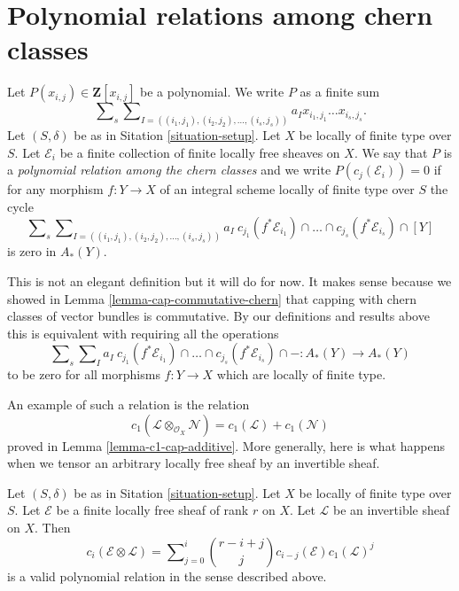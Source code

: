 \section{Polynomial relations among chern classes}
\label{section-relations-chern-classes}

\begin{definition}
\label{definition-polynomial-relation-chern-classes}
Let $P(x_{i, j}) \in \mathbf{Z}[x_{i, j}]$ be a polynomial.
We write $P$ as a finite sum
$$
\sum\nolimits_s
\sum\nolimits_{I = ((i_1, j_1), (i_2, j_2), \ldots, (i_s, j_s))}
a_I x_{i_1, j_1} \ldots x_{i_s, j_s}.
$$
Let $(S, \delta)$ be as in Sitation \ref{situation-setup}.
Let $X$ be locally of finite type over $S$.
Let $\mathcal{E}_i$ be a finite collection of finite
locally free sheaves on $X$. We say that $P$
is a {\it polynomial relation among the chern classes}
and we write $P(c_j(\mathcal{E}_i)) = 0$
if for any morphism $f : Y \to X$ of an integral scheme
locally of finite type over $S$ the cycle
$$
\sum\nolimits_s
\sum\nolimits_{I = ((i_1, j_1), (i_2, j_2), \ldots, (i_s, j_s))}
a_I\ c_{j_1}(f^*\mathcal{E}_{i_1}) \cap \ldots
\cap c_{j_s}(f^*\mathcal{E}_{i_s}) \cap [Y]
$$
is zero in $A_*(Y)$.
\end{definition}

\noindent
This is not an elegant definition but it will do
for now. It makes sense because we showed in
Lemma \ref{lemma-cap-commutative-chern} that
capping with chern classes of vector bundles is commutative.
By our definitions and results above
this is equivalent with requiring all the
operations
$$
\sum\nolimits_s
\sum\nolimits_I
a_I\ c_{j_1}(f^*\mathcal{E}_{i_1}) \cap \ldots
\cap c_{j_s}(f^*\mathcal{E}_{i_s}) \cap - :
A_*(Y) \to A_*(Y)
$$
to be zero for all morphisms $f : Y \to X$ which are locally of finite type.

\medskip\noindent
An example of such a relation is the relation
$$
c_1(\mathcal{L} \otimes_{\mathcal{O}_X} \mathcal{N})
=
c_1(\mathcal{L}) + c_1(\mathcal{N})
$$
proved in Lemma \ref{lemma-c1-cap-additive}.
More generally, here is what happens when we tensor an
arbitrary locally free sheaf by an invertible sheaf.

\begin{lemma}
\label{lemma-chern-classes-E-tensor-L}
Let $(S, \delta)$ be as in Sitation \ref{situation-setup}.
Let $X$ be locally of finite type over $S$.
Let $\mathcal{E}$ be a finite locally free sheaf of
rank $r$ on $X$. Let $\mathcal{L}$ be an invertible
sheaf on $X$. Then
\begin{equation}
\label{equation-twist}
c_i({\mathcal E}\otimes {\mathcal L})
=
\sum\nolimits_{j = 0}^i
\binom{r - i + j}{j} c_{i - j}({\mathcal E}) c_1({\mathcal L})^j
\end{equation}
is a valid polynomial relation in the sense described above.
\end{lemma}

